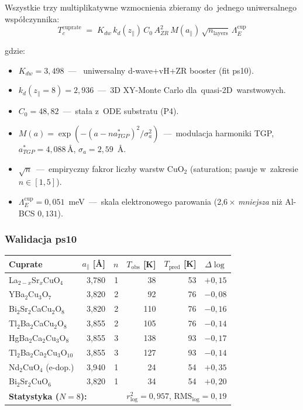 Wszystkie trzy multiplikatywne wzmocnienia zbieramy do~jednego
uniwersalnego wsp\'o\l{}czynnika:
\[
  \boxed{\quad
    T_c^{\text{cuprate}}
    \;=\; K_{dw}\,k_d(z_\parallel)\,C_0\,A_{ZR}^2\,M(a_\parallel)\,
    \sqrt{n_\text{layers}}\,\Lambda_E^{\text{cup}}
  \quad}
\]

\noindent gdzie:
\begin{itemize}\itemsep0pt
  \item $K_{dw}=3{,}498$~---~ uniwersalny d-wave+vH+ZR booster
    (fit ps10).
  \item $k_d(z_\parallel=8)=2{,}936$~---~3D XY-Monte Carlo
    dla~quasi-2D~warstwowych.
  \item $C_0=48{,}82$~---~sta\l{}a z~ODE substratu (P4).
  \item $M(a)=\exp(-(a-n a^*_{TGP})^2/\sigma_a^2)$~---~modulacja
    harmoniki TGP, $a^*_{TGP}=4{,}088$\,\AA, $\sigma_a=2{,}59$~\AA.
  \item $\sqrt{n}$~---~empiryczny fakror liczby warstw CuO${}_2$
    (saturation; pasuje w~zakresie $n\in[1,5]$).
  \item $\Lambda_E^{\text{cup}}=0{,}051$~meV~---~skala elektronowego
    parowania (2{,}6\,\(\times\) \emph{mniejsza} ni\.z Al-BCS $0{,}131$).
\end{itemize}

\subsubsection{Walidacja ps10}

\begin{center}
\begin{tabular}{lrrrrr}
\toprule
Cuprate & $a_\parallel$ [\AA] & $n$ & $T_\text{obs}$ [K] & $T_\text{pred}$ [K] & $\Delta\log$ \\
\midrule
La$_{2-x}$Sr$_x$CuO$_4$ & 3{,}780 & 1 & 38 & 53 & $+0{,}15$ \\
YBa$_2$Cu$_3$O$_7$ & 3{,}820 & 2 & 92 & 76 & $-0{,}08$ \\
Bi$_2$Sr$_2$CaCu$_2$O$_8$ & 3{,}820 & 2 & 110 & 76 & $-0{,}16$ \\
Tl$_2$Ba$_2$CaCu$_2$O$_8$ & 3{,}855 & 2 & 105 & 76 & $-0{,}14$ \\
HgBa$_2$Ca$_2$Cu$_3$O$_8$ & 3{,}855 & 3 & 138 & 93 & $-0{,}17$ \\
Tl$_2$Ba$_2$Ca$_2$Cu$_3$O$_{10}$ & 3{,}855 & 3 & 127 & 93 & $-0{,}14$ \\
Nd$_2$CuO$_4$ (e-dop.) & 3{,}940 & 1 & 24 & 54 & $+0{,}35$ \\
Bi$_2$Sr$_2$CuO$_6$ & 3{,}820 & 1 & 34 & 54 & $+0{,}20$ \\
\midrule
\multicolumn{3}{l}{\textbf{Statystyka ($N=8$):}}
& \multicolumn{3}{r}{$r^2_{\log}=0{,}957$,\; $\mathrm{RMS}_{\log}=0{,}19$}
\\
\bottomrule
\end{tabular}
\end{center}

